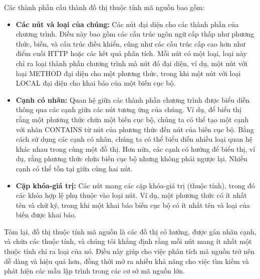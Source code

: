 
Các thành phần cấu thành đồ thị thuộc tính mã nguồn bao gồm:

\begin{itemize}
  \item \textbf{Các nút và loại của chúng:} Các nút đại diện cho các thành phần của chương trình.
  Điều này bao gồm các cấu trúc ngôn ngữ cấp thấp như phương thức, biến, và cấu trúc điều khiển, cũng như các cấu trúc cấp cao hơn như điểm cuối HTTP hoặc các kết quả phân tích.
  Mỗi nút có một loại, loại này chỉ ra loại thành phần chương trình mà nút đó đại diện, ví dụ, một nút với loại METHOD đại diện cho một phương thức, trong khi một nút với loại LOCAL đại diện cho khai báo của một biến cục bộ.
  \item \textbf{Cạnh có nhãn:} Quan hệ giữa các thành phần chương trình được biểu diễn thông qua các cạnh giữa các nút tương ứng của chúng.
  Ví dụ, để biểu thị rằng một phương thức chứa một biến cục bộ, chúng ta có thể tạo một cạnh với nhãn CONTAINS từ nút của phương thức đến nút của biến cục bộ.
  Bằng cách sử dụng các cạnh có nhãn, chúng ta có thể biểu diễn nhiều loại quan hệ khác nhau trong cùng một đồ thị.
  Hơn nữa, các cạnh có hướng để biểu thị, ví dụ, rằng phương thức chứa biến cục bộ nhưng không phải ngược lại.
  Nhiều cạnh có thể tồn tại giữa cùng hai nút.
  \item \textbf{Cặp khóa-giá trị:} Các nút mang các cặp khóa-giá trị (thuộc tính), trong đó các khóa hợp lệ phụ thuộc vào loại nút.
  Ví dụ, một phương thức có ít nhất tên và chữ ký, trong khi một khai báo biến cục bộ có ít nhất tên và loại của biến được khai báo.
\end{itemize}

Tóm lại, đồ thị thuộc tính mã nguồn là các đồ thị có hướng, được gán nhãn cạnh, và chứa các thuộc tính, và chúng tôi khẳng định rằng mỗi nút mang ít nhất một thuộc tính chỉ ra loại của nó.
Điều này giúp cho việc phân tích mã nguồn trở nên dễ dàng và hiệu quả hơn, đồng thời mở ra nhiều khả năng cho việc tìm kiếm và phát hiện các mẫu lập trình trong các cơ sở mã nguồn lớn.

